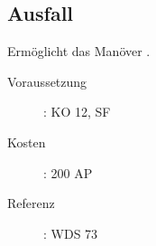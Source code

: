 \subsection{Ausfall}
\label{sf.ausfall}
Ermöglicht das Manöver .
\begin{description}
    \item[Voraussetzung]:
        KO 12, SF 
    \item [Kosten]:
        200 AP
    \item [Referenz]:
        WDS 73
\end{description}

